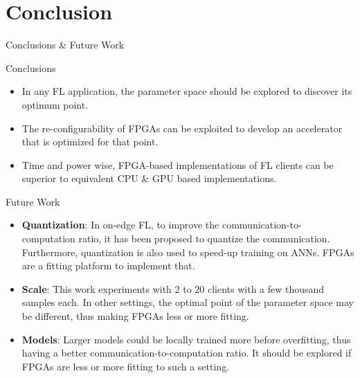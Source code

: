\setlength{\parskip}{\baselineskip}
\section{Conclusion}

\begin{frame}
	\huge Conclusions \& Future Work
\end{frame}

\begin{frame}{Conclusions}
	\begin{itemize}
		\item In any FL application, the parameter space should be explored to discover its optimum point. %
		\item The re-configurability of FPGAs can be exploited to develop an accelerator that is optimized for that point.
		\item Time and power wise, FPGA-based implementations of FL clients can be superior to equivalent CPU \& GPU based implementations.
		
	\end{itemize}
\end{frame}

\begin{frame}{Future Work}
	\begin{itemize}
		\item \textbf{Quantization}: In on-edge FL, to improve the communication-to-computation ratio, it has been proposed to quantize the communication. Furthermore, quantization is also used to speed-up training on ANNs. FPGAs are a fitting platform to implement that. %
	
		\item \textbf{Scale}: This work experiments with 2 to 20 clients with a few thousand samples each. In other settings, the optimal point of the parameter space may be different, thus making FPGAs less or more fitting. 
	
		\item \textbf{Models}: Larger models could be locally trained more before overfitting, thus having a better communication-to-computation ratio. It should be explored if FPGAs are less or more fitting to such a setting.
	\end{itemize}
\end{frame}
